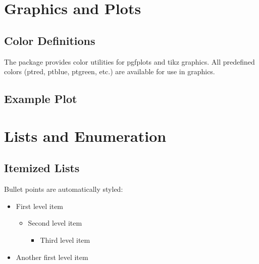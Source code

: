 \documentclass[11pt,letterpaper]{article}
\begin{document}
\section{Graphics and Plots}

\subsection{Color Definitions}

The package provides color utilities for pgfplots and tikz graphics. All predefined colors (ptred, ptblue, ptgreen, etc.) are available for use in graphics.

\subsection{Example Plot}

\begin{center}
\end{center}

\section{Lists and Enumeration}

\subsection{Itemized Lists}

Bullet points are automatically styled:

\begin{itemize}
    \item First level item
          \begin{itemize}
              \item Second level item
                    \begin{itemize}
                        \item Third level item
                    \end{itemize}
          \end{itemize}
    \item Another first level item
\end{itemize}
\end{document}
